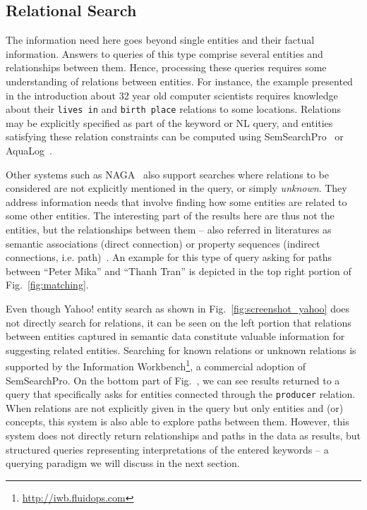 \subsection{Relational Search} The information need here goes beyond single entities and their factual information. Answers to queries of this type comprise several entities and relationships between them. Hence, processing these queries requires some understanding of relations between entities. For instance, the example presented in the introduction about 32 year old computer scientists requires knowledge about their \verb+lives in+ and \verb+birth place+ relations to some locations. Relations may be explicitly specified as part of the keyword or NL query, and entities satisfying these relation constraints can be computed using SemSearchPro~\cite{DBLP:journals/ws/TranHL11} or AquaLog~\cite{DBLP:journals/ws/LopezUMP07}. 

Other systems such as NAGA~\cite{DBLP:conf/icde/KasneciSIRW08} also support searches where relations to be considered are not explicitly mentioned in the query, or simply \emph{unknown}. They address information needs that involve finding how some entities are related to some other entities. The interesting part of the results here are thus not the entities, but the relationships between them -- also referred in literatures as semantic associations (direct connection) or property sequences (indirect connections, i.e. path)~\cite{DBLP:conf/www/AnyanwuS03}. An example for this type of query asking for paths between ``Peter Mika'' and ``Thanh Tran'' is depicted in the top right portion of Fig.~\ref{fig:matching}.

Even though Yahoo! entity search as shown in Fig.~\ref{fig:screenshot_yahoo} does not directly search for relations, it can be seen on the left portion that relations between entities captured in semantic data constitute valuable information for suggesting related entities. Searching for known relations or unknown relations is supported by the Information Workbench\footnote{\url{http://iwb.fluidops.com}}, a commercial adoption of SemSearchPro. On the bottom part of Fig.~\cite{fig:screenshot_iwb}, we can see results returned to a query that specifically asks for entities connected through the \verb+producer+ relation. When relations are not explicitly given in the query but only entities and (or) concepts, this system is also able to explore paths between them. However, this system does not directly return relationships and paths in the data as results, but structured queries representing interpretations of the entered keywords -- a querying paradigm we will discuss in the next section. 


